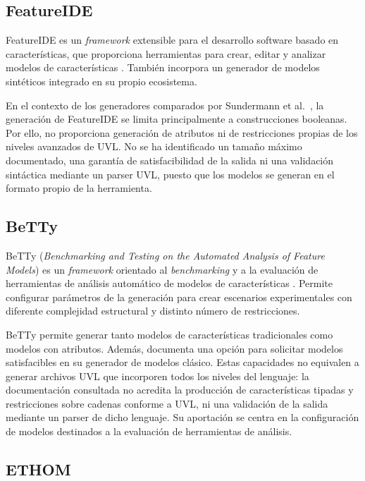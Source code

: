 \subsection{FeatureIDE}

FeatureIDE es un \textit{framework} extensible para el desarrollo software basado en
características, que proporciona herramientas para crear, editar y analizar
modelos de características \cite{featureide}. También incorpora un generador
de modelos sintéticos integrado en su propio ecosistema.

En el contexto de los generadores comparados por Sundermann et
al.~\cite{sundermann2024generating}, la generación de FeatureIDE se limita
principalmente a construcciones booleanas. Por ello, no proporciona generación
de atributos ni de restricciones propias de los niveles avanzados de UVL. No se
ha identificado un tamaño máximo documentado, una garantía de
satisfacibilidad de la salida ni una validación sintáctica mediante un parser
UVL, puesto que los modelos se generan en el formato propio de la herramienta.

\subsection{BeTTy}

BeTTy (\textit{Benchmarking and Testing on the Automated Analysis of Feature
Models}) es un \textit{framework} orientado al \textit{benchmarking} y a la evaluación
de herramientas de análisis automático de modelos de características
\cite{betty}. Permite configurar parámetros de la generación para crear
escenarios experimentales con diferente complejidad estructural y distinto
número de restricciones.

BeTTy permite generar tanto modelos de características tradicionales como
modelos con atributos. Además, documenta una opción para solicitar modelos
satisfacibles en su generador de modelos clásico. Estas capacidades no
equivalen a generar archivos UVL que incorporen todos los niveles del
lenguaje: la documentación consultada no acredita la producción de
características tipadas y restricciones sobre cadenas conforme a UVL, ni una
validación de la salida mediante un parser de dicho lenguaje. Su aportación
se centra en la configuración de modelos destinados a la evaluación de
herramientas de análisis.

\subsection{ETHOM}

